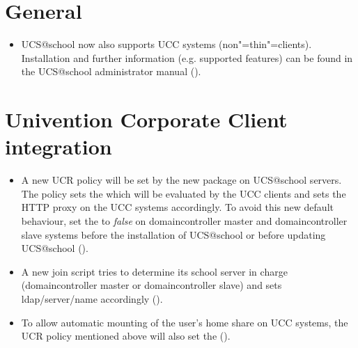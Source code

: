 \section{General}
\begin{itemize}
\item UCS@school now also supports UCC systems (non"=thin"=clients). Installation and further information
  (e.g. supported features) can be found in the UCS@school administrator manual ().
\end{itemize}

\section{Univention Corporate Client integration}
\begin{itemize}
\item A new UCR policy will be set by the new package  on UCS@school
  servers. The policy sets the  which will be evaluated by the UCC clients and sets
  the HTTP proxy on the UCC systems accordingly. To avoid this new default behaviour, set the
   to \emph{false} on domaincontroller master
  and domaincontroller slave systems before the installation of UCS@school or before updating UCS@school
  ().
\item A new join script tries to determine its school server in charge (domaincontroller master or domaincontroller
  slave) and sets ldap/server/name accordingly ().
\item To allow automatic mounting of the user's home share on UCC systems, the UCR policy mentioned above will also set the
   ().
\end{itemize}

 

